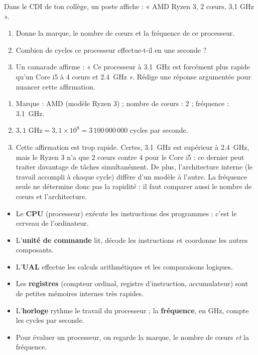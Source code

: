 \documentclass[11pt]{article}
\begin{document}
\begin{exercice}
Dans le CDI de ton collège, un poste affiche : « AMD Ryzen 3, 2 cœurs, 3,1 GHz ».
\begin{enumerate}
\item Donne la marque, le nombre de cœurs et la fréquence de ce processeur.
\item Combien de cycles ce processeur effectue-t-il en une seconde ?
\item Un camarade affirme : « Ce processeur à \SI{3,1}{GHz} est forcément plus rapide qu'un Core i5 à 4 cœurs et \SI{2,4}{GHz} ». Rédige une réponse argumentée pour nuancer cette affirmation.
\end{enumerate}
\end{exercice}

\begin{corrige}
\begin{enumerate}
\item Marque : AMD (modèle Ryzen 3) ; nombre de cœurs : 2 ; fréquence : \SI{3,1}{GHz}.
\item $3,1 \text{ GHz} = 3,1 \times 10^{9} = 3\,100\,000\,000$ cycles par seconde.
\item Cette affirmation est trop rapide. Certes, \SI{3,1}{GHz} est supérieur à \SI{2,4}{GHz}, mais le Ryzen 3 n'a que 2 cœurs contre 4 pour le Core i5 : ce dernier peut traiter davantage de tâches simultanément. De plus, l'architecture interne (le travail accompli à chaque cycle) diffère d'un modèle à l'autre. La fréquence seule ne détermine donc pas la rapidité : il faut comparer aussi le nombre de cœurs et l'architecture.
\end{enumerate}
\end{corrige}

\begin{aretenir}
\begin{itemize}
\item Le \textbf{CPU} (processeur) exécute les instructions des programmes : c'est le cerveau de l'ordinateur.
\item L'\textbf{unité de commande} lit, décode les instructions et coordonne les autres composants.
\item L'\textbf{UAL} effectue les calculs arithmétiques et les comparaisons logiques.
\item Les \textbf{registres} (compteur ordinal, registre d'instruction, accumulateur) sont de petites mémoires internes très rapides.
\item L'\textbf{horloge} rythme le travail du processeur ; la \textbf{fréquence}, en GHz, compte les cycles par seconde.
\item Pour évaluer un processeur, on regarde la marque, le nombre de cœurs \emph{et} la fréquence.
\end{itemize}
\end{aretenir}
\end{document}
